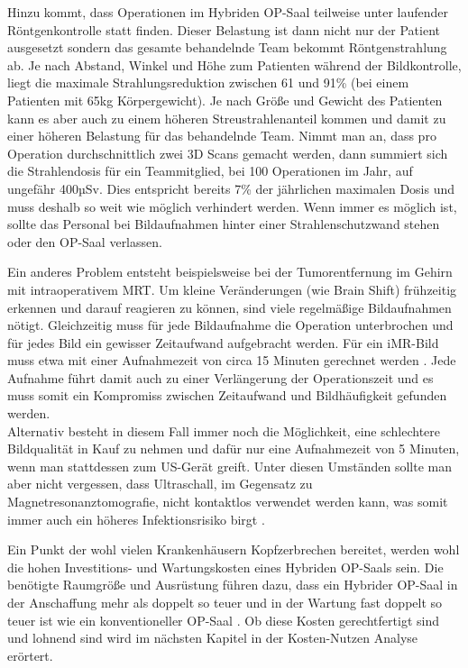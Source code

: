 Hinzu kommt, dass Operationen im Hybriden OP-Saal teilweise unter laufender Röntgenkontrolle statt finden. Dieser Belastung ist dann nicht nur der Patient ausgesetzt sondern das gesamte behandelnde Team bekommt Röntgenstrahlung ab. Je nach Abstand, Winkel und Höhe zum Patienten während der Bildkontrolle, liegt die maximale Strahlungsreduktion zwischen 61 und 91\% (bei einem Patienten mit 65kg Körpergewicht). Je nach Größe und Gewicht des Patienten kann es aber auch zu einem höheren Streustrahlenanteil kommen und damit zu einer höheren Belastung für das behandelnde Team.
Nimmt man an, dass pro Operation durchschnittlich zwei 3D Scans gemacht werden, dann summiert sich die Strahlendosis für ein Teammitglied, bei 100 Operationen im Jahr, auf ungefähr 400µSv. Dies entspricht bereits 7\% der jährlichen maximalen Dosis und muss deshalb so weit wie möglich verhindert werden. Wenn immer es möglich ist, sollte das Personal bei Bildaufnahmen hinter einer Strahlenschutzwand stehen oder den OP-Saal verlassen\cite{RadiationExposure}.

Ein anderes Problem entsteht beispielsweise bei der Tumorentfernung im Gehirn mit intraoperativem MRT. Um kleine Veränderungen (wie Brain Shift) frühzeitig erkennen und darauf reagieren zu können, sind viele regelmäßige Bildaufnahmen nötigt. Gleichzeitig muss für jede Bildaufnahme die Operation unterbrochen und für jedes Bild ein gewisser Zeitaufwand aufgebracht werden. Für ein iMR-Bild muss etwa mit einer Aufnahmezeit von circa 15 Minuten gerechnet werden \cite{BrainShiftInTumorResection}. Jede Aufnahme führt damit auch zu einer Verlängerung der Operationszeit und es muss somit ein Kompromiss zwischen Zeitaufwand und Bildhäufigkeit gefunden werden.\\
Alternativ besteht in diesem Fall immer noch die Möglichkeit, eine schlechtere Bildqualität in Kauf zu nehmen und dafür nur eine Aufnahmezeit von 5 Minuten, wenn man stattdessen zum US-Gerät greift. Unter diesen Umständen sollte man aber nicht vergessen, dass Ultraschall, im Gegensatz zu Magnetresonanztomografie, nicht kontaktlos verwendet werden kann, was somit immer auch ein höheres Infektionsrisiko birgt \cite{BrainShiftInTumorResection}.

Ein Punkt der wohl vielen Krankenhäusern Kopfzerbrechen bereitet, werden wohl die hohen Investitions- und Wartungskosten eines Hybriden OP-Saals sein. Die benötigte Raumgröße und Ausrüstung führen dazu, dass ein Hybrider OP-Saal in der Anschaffung mehr als doppelt so teuer und in der Wartung fast doppelt so teuer ist wie ein konventioneller OP-Saal \cite{HybridOR}. 
Ob diese Kosten gerechtfertigt sind und lohnend sind wird im nächsten Kapitel in der Kosten-Nutzen Analyse erörtert.

